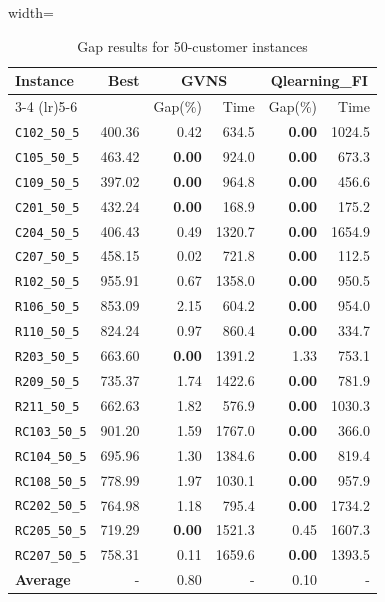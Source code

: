 \begin{table}[ht]
\centering
\small
\setlength{\tabcolsep}{5pt}
\caption{Gap results for 50-customer instances}
\vspace{4mm}
\begin{adjustbox}{width=\textwidth}
\begin{tabular}{l r r r @{\hspace{8pt}} r r @{\hspace{8pt}}}
\toprule
\multirow{2}{*}{Instance} & \multirow{2}{*}{Best} & \multicolumn{2}{c}{GVNS} & \multicolumn{2}{c}{Qlearning\_FI} \\
\cmidrule(lr){3-4} \cmidrule(lr){5-6}
 &  & Gap(\%) & Time & Gap(\%) & Time \\
\midrule
\texttt{C102\_50\_5} & 400.36 & 0.42 & 634.5 & \textbf{0.00} & 1024.5 \\
\texttt{C105\_50\_5} & 463.42 & \textbf{0.00} & 924.0 & \textbf{0.00} & 673.3 \\
\texttt{C109\_50\_5} & 397.02 & \textbf{0.00} & 964.8 & \textbf{0.00} & 456.6 \\
\texttt{C201\_50\_5} & 432.24 & \textbf{0.00} & 168.9 & \textbf{0.00} & 175.2 \\
\texttt{C204\_50\_5} & 406.43 & 0.49 & 1320.7 & \textbf{0.00} & 1654.9 \\
\texttt{C207\_50\_5} & 458.15 & 0.02 & 721.8 & \textbf{0.00} & 112.5 \\
\texttt{R102\_50\_5} & 955.91 & 0.67 & 1358.0 & \textbf{0.00} & 950.5 \\
\texttt{R106\_50\_5} & 853.09 & 2.15 & 604.2 & \textbf{0.00} & 954.0 \\
\texttt{R110\_50\_5} & 824.24 & 0.97 & 860.4 & \textbf{0.00} & 334.7 \\
\texttt{R203\_50\_5} & 663.60 & \textbf{0.00} & 1391.2 & 1.33 & 753.1 \\
\texttt{R209\_50\_5} & 735.37 & 1.74 & 1422.6 & \textbf{0.00} & 781.9 \\
\texttt{R211\_50\_5} & 662.63 & 1.82 & 576.9 & \textbf{0.00} & 1030.3 \\
\texttt{RC103\_50\_5} & 901.20 & 1.59 & 1767.0 & \textbf{0.00} & 366.0 \\
\texttt{RC104\_50\_5} & 695.96 & 1.30 & 1384.6 & \textbf{0.00} & 819.4 \\
\texttt{RC108\_50\_5} & 778.99 & 1.97 & 1030.1 & \textbf{0.00} & 957.9 \\
\texttt{RC202\_50\_5} & 764.98 & 1.18 & 795.4 & \textbf{0.00} & 1734.2 \\
\texttt{RC205\_50\_5} & 719.29 & \textbf{0.00} & 1521.3 & 0.45 & 1607.3 \\
\texttt{RC207\_50\_5} & 758.31 & 0.11 & 1659.6 & \textbf{0.00} & 1393.5 \\
\midrule
\textbf{Average} & - & 0.80 & - & 0.10 & - \\
\bottomrule
\end{tabular}
\end{adjustbox}
\end{table}